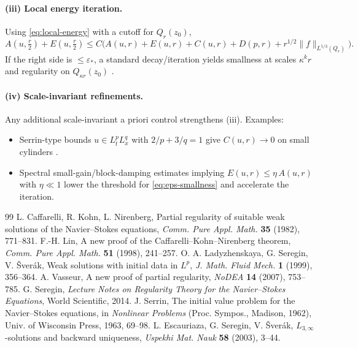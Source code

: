 \IfFileExists{nyjm.cls}{\documentclass[11pt]{nyjm}}{\documentclass[11pt]{amsart}}
\theoremstyle{plain}
\theoremstyle{definition}
\theoremstyle{remark}
\begin{document}
\paragraph{(iii) Local energy iteration.}
Using \eqref{eq:local-energy} with a cutoff for $Q_r(z_0)$,
\[
A\!\left(u,\tfrac r2\right)+E\!\left(u,\tfrac r2\right)
\le C\Big(A(u,r)+E(u,r)+C(u,r)+D(p,r)+ r^{1/2}\|f\|_{L^{5/3}(Q_r)}\Big).
\]
If the right side is $\le \varepsilon_*$, a standard decay/iteration yields smallness at scales $\kappa^k r$ and regularity on $Q_{\kappa r}(z_0)$ \cite{CKN1982,Lin1998}.

\paragraph{(iv) Scale-invariant refinements.}
Any additional scale-invariant a priori control strengthens (iii). Examples:
\begin{itemize}
\item Serrin-type bounds $u\in L^p_tL^q_x$ with $2/p+3/q=1$ give $C(u,r)\to0$ on small cylinders \cite{Serrin1963,EscauriazaSereginSverak2003}.
\item Spectral small-gain/block-damping estimates implying $E(u,r)\le \eta\,A(u,r)$ with $\eta\ll1$ lower the threshold for \eqref{eq:eps-smallness} and accelerate the iteration.
\end{itemize}

\begin{thebibliography}{99}
L. Caffarelli, R. Kohn, L. Nirenberg, Partial regularity of suitable weak solutions of the Navier–Stokes equations, \emph{Comm. Pure Appl. Math.} \textbf{35} (1982), 771–831.
F.-H. Lin, A new proof of the Caffarelli–Kohn–Nirenberg theorem, \emph{Comm. Pure Appl. Math.} \textbf{51} (1998), 241–257.
O. A. Ladyzhenskaya, G. Seregin, V. \v{S}ver\'ak, Weak solutions with initial data in $L^p$, \emph{J. Math. Fluid Mech.} \textbf{1} (1999), 356–364.
A. Vasseur, A new proof of partial regularity, \emph{NoDEA} \textbf{14} (2007), 753–785.
G. Seregin, \emph{Lecture Notes on Regularity Theory for the Navier–Stokes Equations}, World Scientific, 2014.
J. Serrin, The initial value problem for the Navier–Stokes equations, in \emph{Nonlinear Problems} (Proc. Sympos., Madison, 1962), Univ. of Wisconsin Press, 1963, 69–98.
L. Escauriaza, G. Seregin, V. \v{S}ver\'ak, $L_{3,\infty}$-solutions and backward uniqueness, \emph{Uspekhi Mat. Nauk} \textbf{58} (2003), 3–44.
\end{thebibliography}
\end{document}
